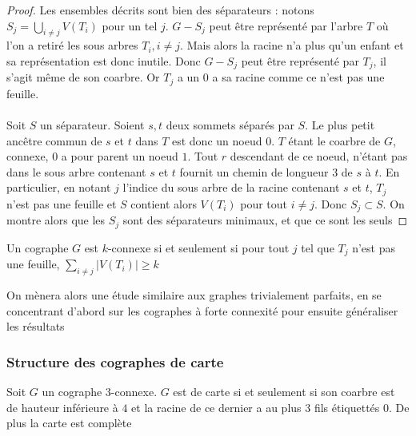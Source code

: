 \documentclass{scrartcl}
\begin{document}
\begin{flushleft}
\begin{proof}
    Les ensembles décrits sont bien des séparateurs : notons $\displaystyle S_j = \bigcup_{i \neq j} V(T_i)$ pour un tel $j$. $G - S_j$ peut être
    représenté par l'arbre $T$ où l'on a retiré les sous arbres $T_i, i \neq j$. Mais alors la racine n'a plus qu'un enfant et sa représentation est donc
    inutile. Donc $G - S_j$ peut être représenté par $T_j$, il s'agit même de son coarbre. Or $T_j$ a un $0$ a sa racine comme ce n'est pas une feuille.
    \\~\\
    Soit $S$ un séparateur. Soient $s, t$ deux sommets séparés par $S$. Le plus petit ancêtre commun de $s$ et $t$ dans $T$
    est donc un noeud $0$. $T$ étant le coarbre de $G$, connexe, $0$ a pour parent un noeud $1$. Tout $r$ descendant de ce noeud, n'étant pas dans le
    sous arbre contenant $s$ et $t$ fournit un chemin de longueur $3$ de $s$ à $t$. En particulier, en notant $j$ l'indice du sous arbre de la racine
    contenant $s$ et $t$, $T_j$ n'est pas une feuille et $S$ contient alors $V(T_i)$ pour tout $i \neq j$. Donc $S_j \subset S$. On montre
    alors que les $S_j$ sont des séparateurs minimaux, et que ce sont les seuls
\end{proof}

\begin{cor}\label{coarbrekconn}
    Un cographe $G$ est $k$-connexe si et seulement si pour tout $j$ tel que $T_j$ n'est pas une feuille, $\sum_{i \neq j} |V(T_i)| \geq k$
\end{cor}

On mènera alors une étude similaire aux graphes trivialement parfaits, en se concentrant d'abord sur les cographes à forte connexité pour ensuite
généraliser les résultats

\subsubsection{Structure des cographes de carte}

\begin{lem}\label{cograph3conn}
    Soit $G$ un cographe $3$-connexe. $G$ est de carte si et seulement si son coarbre est de hauteur inférieure à $4$ et la racine de ce dernier
    a au plus $3$ fils étiquettés $0$. De plus la carte est complète
\end{lem}


\end{flushleft}
\end{document}
